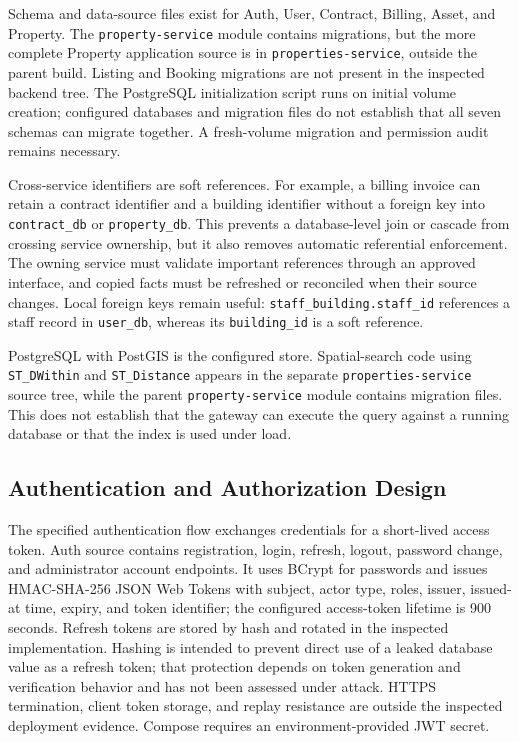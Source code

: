 Schema and data-source files exist for Auth, User, Contract, Billing, Asset, and Property. The \texttt{property-service} module contains migrations, but the more complete Property application source is in \texttt{properties-service}, outside the parent build. Listing and Booking migrations are not present in the inspected backend tree. The PostgreSQL initialization script runs on initial volume creation; configured databases and migration files do not establish that all seven schemas can migrate together. A fresh-volume migration and permission audit remains necessary.

Cross-service identifiers are soft references. For example, a billing invoice can retain a contract identifier and a building identifier without a foreign key into \texttt{contract\_db} or \texttt{property\_db}. This prevents a database-level join or cascade from crossing service ownership, but it also removes automatic referential enforcement. The owning service must validate important references through an approved interface, and copied facts must be refreshed or reconciled when their source changes. Local foreign keys remain useful: \texttt{staff\_building.staff\_id} references a staff record in \texttt{user\_db}, whereas its \texttt{building\_id} is a soft reference.

PostgreSQL with PostGIS is the configured store. Spatial-search code using \texttt{ST\_DWithin} and \texttt{ST\_Distance} appears in the separate \texttt{properties-service} source tree, while the parent \texttt{property-service} module contains migration files. This does not establish that the gateway can execute the query against a running database or that the index is used under load.



\subsection{Authentication and Authorization Design}
The specified authentication flow exchanges credentials for a short-lived access token. Auth source contains registration, login, refresh, logout, password change, and administrator account endpoints. It uses BCrypt for passwords and issues HMAC-SHA-256 JSON Web Tokens with subject, actor type, roles, issuer, issued-at time, expiry, and token identifier; the configured access-token lifetime is 900 seconds. Refresh tokens are stored by hash and rotated in the inspected implementation. Hashing is intended to prevent direct use of a leaked database value as a refresh token; that protection depends on token generation and verification behavior and has not been assessed under attack. HTTPS termination, client token storage, and replay resistance are outside the inspected deployment evidence. Compose requires an environment-provided JWT secret.

